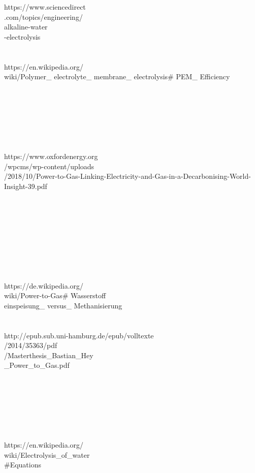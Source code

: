 \documentclass[11pt,a4paper]{article}
\begin{document}
\begin{parcolumns}[colwidths={1=2.5 cm, 2=10 cm, 3=2.5 cm}]{3}
{https://www.sciencedirect\\.com/topics/engineering/\\alkaline-water\\-electrolysis
\\ \\ \\
https://en.wikipedia.org/\\wiki/Polymer\_ electrolyte\_ membrane\_ electrolysis\# PEM\_ Efficiency
\\ \\ \\ \\ \\ \\ \\ \\
https://www.oxfordenergy.org\\/wpcms/wp-content/uploads\\/2018/10/Power-to-Gas-Linking-Electricity-and-Gas-in-a-Decarbonising-World-Insight-39.pdf
\\ \\ \\ \\ \\ 
\\ \\ \\ \\ \\
https://de.wikipedia.org/\\wiki/Power-to-Gas\# Wasserstoff\\einspeisung\_ versus\_ Methanisierung
\\ \\ \\ 
http://epub.sub.uni-hamburg.de/epub/volltexte\\/2014/35363/pdf\\/Masterthesis\_Bastian\_Hey \\
\_Power\_to\_Gas.pdf
\\ \\ \\ \\ \\ \\ \\ \\ 
https://en.wikipedia.org/\\wiki/Electrolysis\_of\_water \\ 
\#Equations
\\ \\ \\ \\ \\ \\ \\ \\ \\ \\ \\ \\ \\ \\ \\
}
\end{parcolumns}
\end{document}
